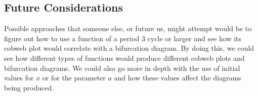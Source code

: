 \documentclass{article}
\begin{document}
\subsection{Future Considerations}
Possible approaches that someone else, or future us, might attempt would be to figure out how to use a function of a period 3 cycle or larger and see how its cobweb plot would correlate with a bifurcation diagram. By doing this, we could see how different types of functions would produce different cobweb plots and bifurcation diagrams. We could also go more in depth with the use of initial values for $x$ or for the parameter $a$ and how these values affect the diagrams being produced. 


\cite{weisstein2001logistic}
\cite{shapiro2018scientific}
\cite{boeing2018pynamical}


\end{document}
